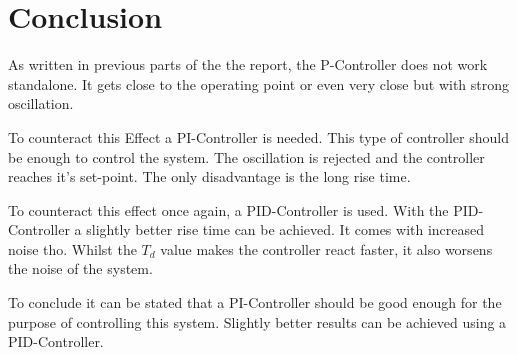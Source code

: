 \section{Conclusion}

As written in previous parts of the the report, the P-Controller does not work standalone. It gets close to the operating point or even very close but with strong oscillation.

To counteract this Effect a PI-Controller is needed. This type of controller should be enough to control the system. The oscillation is rejected and the controller reaches it's set-point. The only disadvantage is the long rise time.

To counteract this effect once again, a PID-Controller is used. With the PID-Controller a slightly better rise time can be achieved. It comes with increased noise tho. Whilst the $T_d$ value makes the controller react faster, it also worsens the noise of the system.

To conclude it can be stated that a PI-Controller should be good enough for the purpose of controlling this system. Slightly better results can be achieved using a PID-Controller.

